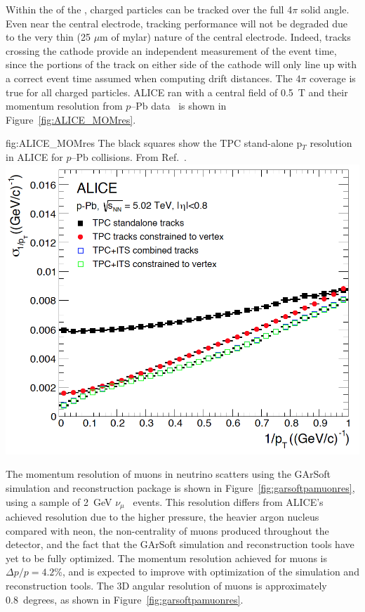 Within the  of the , charged particles can be tracked over the full 4$\pi$ solid angle.  Even near the central electrode, tracking performance will not be degraded due to the very thin (25 $\mu$m of mylar) nature of the central electrode.   Indeed, tracks crossing the cathode provide an independent measurement of the event time, since the portions of the track on either side of the cathode will only line up with a correct event time assumed when computing drift distances. The 4$\pi$ coverage is true for all charged particles.  ALICE ran with a central field of 0.5~T and their momentum resolution from $p$--Pb data~\cite{Abelev:2014ffa} is shown in Figure~\ref{fig:ALICE_MOMres}.
%
\begin{dunefigure}{fig:ALICE_MOMres}
{The black squares show the TPC stand-alone p$_T$ resolution in ALICE for $p$--Pb collisions. From Ref.~\cite{Abelev:2014ffa}.}
\includegraphics[width=0.65\columnwidth]{graphics/ALICE_mom_res.png}
\end{dunefigure}
%
The momentum resolution of muons in neutrino scatters using the GArSoft simulation and reconstruction package is shown in Figure~\ref{fig:garsoftpamuonres}, using a sample of 2~GeV $\nu_\mu$~ events.  This resolution differs from ALICE's achieved resolution due to the higher pressure, the heavier argon nucleus compared with neon, the non-centrality of muons produced throughout the detector, and the fact that the GArSoft simulation and reconstruction tools have yet to be fully optimized.  The momentum resolution achieved for muons is $\Delta p/p = 4.2$\%, and is expected to improve with optimization of the simulation and reconstruction tools.  The 3D angular resolution of muons is approximately 0.8~degrees, as shown in Figure~\ref{fig:garsoftpamuonres}. 



